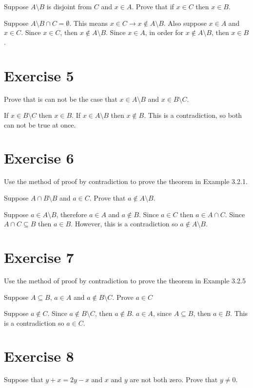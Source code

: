 \documentclass[11pt]{article}
\newcommand{\then}{\rightarrow}
\begin{document}
Suppose $A \setminus B$ is disjoint from $C$ and $x \in A$. Prove that if 
$x \in C$ then $x \in B$.

Suppose $A \setminus B \cap C = \emptyset$. This means 
$x \in C \then x \notin A \setminus B$. Also suppose $x \in A$ and $x \in C$.
Since $x \in C$, then $x \notin A \setminus B$. Since $x \in A$, in order for 
$x \notin A \setminus B$, then $x \in B$.

\section*{Exercise 5}

Prove that is can not be the case that $x \in A \setminus B$ and 
$x \in B \setminus C$.

If $x \in B \setminus C$ then $x \in B$. If $x \in A \setminus B$ then 
$x \notin B$. This is a contradiction, so both can not be true at once.

\section*{Exercise 6}

Use the method of proof by contradiction to prove the theorem in Example 3.2.1.

Suppose $A \cap B \setminus B$ and $a \in C$. Prove that 
$a \notin A \setminus B$.

Suppose $a \in A \setminus B$, therefore $a \in A$ and $a \notin B$. Since 
$a \in C$ then $a \in A \cap C$. Since $A \cap C \subseteq B$ then $a \in B$.
However, this is a contradiction so $a \notin A \setminus B$.

\section*{Exercise 7}

Use the method of proof by contradiction to prove the theorem in Example 3.2.5

Suppose $A \subseteq B$, $a \in A$ and $a \notin B \setminus C$. Prove $a \in C$

Suppose $a \notin C$. Since $a \notin B \setminus C$, then $a \notin B$. 
$a \in A$, since $A \subseteq B$, then $a \in B$. This is a contradiction so 
$a \in C$.

\section*{Exercise 8}

Suppose that $y + x = 2y - x$ and $x$ and $y$ are not both zero. Prove that 
$y \neq 0$.
\end{document}
